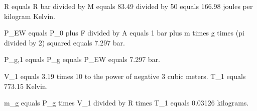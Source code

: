 R equals R bar divided by M equals 83.49 divided by 50 equals 166.98 joules per kilogram Kelvin.  

P_EW equals P_0 plus F divided by A equals 1 bar plus m times g times (pi divided by 2) squared equals 7.297 bar.  

P_g,1 equals P_g equals P_EW equals 7.297 bar.  

V_1 equals 3.19 times 10 to the power of negative 3 cubic meters.  
T_1 equals 773.15 Kelvin.  

m_g equals P_g times V_1 divided by R times T_1 equals 0.03126 kilograms.